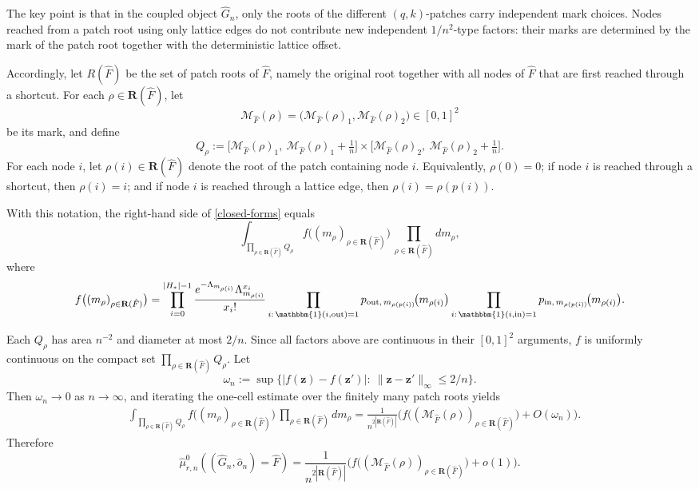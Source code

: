 \documentclass[10pt]{amsart}
\begin{document}
The key point is that in the coupled object $\hat G_n$, only the roots of the different $(q,k)$-patches carry independent mark choices. Nodes reached from a patch root using only lattice edges do not contribute new independent $1/n^2$-type factors: their marks are determined by the mark of the patch root together with the deterministic lattice offset.

Accordingly, let $R(\hat F)$ be the set of patch roots of $\hat F$, namely the original root together with all nodes of $\hat F$ that are first reached
through a shortcut. For each $\rho\in \mathbf R(\hat F)$, let
\[
\mathcal M_{\hat F}(\rho)
=
\big(\mathcal M_{\hat F}(\rho)_1,\mathcal M_{\hat F}(\rho)_2\big)\in[0,1]^2
\]
be its mark, and define
\[
Q_\rho
:=
\big[\mathcal M_{\hat F}(\rho)_1,\ \mathcal M_{\hat F}(\rho)_1+\tfrac1n\big]
\times
\big[\mathcal M_{\hat F}(\rho)_2,\ \mathcal M_{\hat F}(\rho)_2+\tfrac1n\big].
\]
For each node $i$, let $\rho(i)\in \mathbf R(\hat F)$ denote the root of the patch containing node $i$. Equivalently, $\rho(0)=0$; if node $i$ is reached through a shortcut, then $\rho(i)=i$; and if node $i$ is reached through a lattice edge, then $\rho(i)=\rho(p(i))$.

With this notation, the right-hand side of \eqref{closed-forms} equals
\begin{equation}\label{eq:nested-corrected}
\int_{\prod_{\rho\in \mathbf R(\hat F)}Q_\rho}
f\big((m_\rho)_{\rho\in \mathbf R(\hat F)}\big)\,
\prod_{\rho\in \mathbf R(\hat F)}dm_\rho,
\end{equation}
where
\[
f\big((m_\rho)_{\rho\in \mathbf R(\hat F)}\big)
=
\prod_{i=0}^{|H_*|-1}
\frac{e^{-\Lambda_{m_{\rho(i)}}}\Lambda_{m_{\rho(i)}}^{x_i}}{x_i!}
\prod_{i:\,\mathbbm{1}(i,\mathrm{out})=1}
p_{\mathrm{out},\,m_{\rho(p(i))}}\!\big(m_{\rho(i)}\big)
\prod_{i:\,\mathbbm{1}(i,\mathrm{in})=1}
p_{\mathrm{in},\,m_{\rho(p(i))}}\!\big(m_{\rho(i)}\big).
\]

Each $Q_\rho$ has area $n^{-2}$ and diameter at most $2/n$. Since all factors
above are continuous in their $[0,1]^2$ arguments, $f$ is uniformly continuous
on the compact set $\prod_{\rho\in \mathbf R(\hat F)}Q_\rho$. Let
\[
\omega_n
:=
\sup\Big\{
|f(\mathbf z)-f(\mathbf z')|:\ 
\|\mathbf z-\mathbf z'\|_\infty\le 2/n
\Big\}.
\]
Then $\omega_n\to0$ as $n\to\infty$, and iterating the one-cell estimate over
the finitely many patch roots yields
\begin{align*}
&\int_{\prod_{\rho\in \mathbf R(\hat F)}Q_\rho}
f\big((m_\rho)_{\rho\in \mathbf R(\hat F)}\big)\,
\prod_{\rho\in \mathbf R(\hat F)}dm_\rho =
\frac{1}{n^{2|\mathbf R(\hat F)|}}
\Big(
f\big((\mathcal M_{\hat F}(\rho))_{\rho\in \mathbf R(\hat F)}\big)
+O(\omega_n)
\Big).
\end{align*}
Therefore
\begin{equation}\label{closed-form-right}
\hat\mu_{r,n}^0((\hat G_n,\hat o_n)=\hat F)
=
\frac{1}{n^{2|\mathbf R(\hat F)|}}
\Big(
f\big((\mathcal M_{\hat F}(\rho))_{\rho\in \mathbf R(\hat F)}\big)
+o(1)
\Big).
\end{equation}
\end{document}
